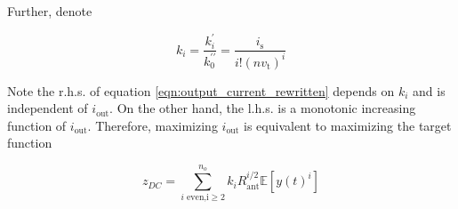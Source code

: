 Further, denote

\begin{equation}\label{eqn:diode_k}
  {k_i} = \frac{{k_i^\prime }}{{k_0^{\prime \prime }}} = \frac{{{i_{\text{s}}}}}{{i!{{\left( {n{v_{\text{t}}}} \right)}^i}}}
\end{equation}

Note the r.h.s. of equation \ref{eqn:output_current_rewritten} depends on ${k_i}$ and is independent of ${i_{{\text{out}}}}$. On the other hand, the l.h.s. is a monotonic increasing function of ${i_{{\text{out}}}}$. Therefore, maximizing ${i_{{\text{out}}}}$ is equivalent to maximizing the target function

\begin{equation}\label{eqn:target_function}
  {z_{DC}} = \sum\limits_{i{\text{ even,i}} \geqslant 2}^{{n_o}} {{k_i}} R_{{\text{ant}}}^{i/2}\mathbb{E}\left[ {y{{(t)}^i}} \right]
\end{equation}